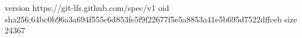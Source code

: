 version https://git-lfs.github.com/spec/v1
oid sha256:64bc0b96a3a694f555c6d853fe5f9f22677f5e5a8853a41e5b695d7522dffceb
size 24367
